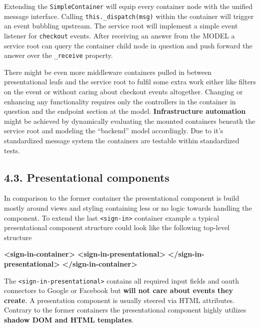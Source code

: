 \documentclass[]{article}
\newenvironment{Shaded}{}{}
\newcommand{\KeywordTok}[1]{\textcolor[rgb]{0.00,0.44,0.13}{\textbf{{#1}}}}
\begin{document}
Extending the \texttt{SimpleContainer} will equip every container node
with the unified message interface. Calling
\texttt{this.\_dispatch(msg)} within the container will trigger an event
bubbling upstream. The service root will implement a simple event
listener for \texttt{checkout} events. After receiving an answer from
the MODEL a service root can query the container child node in question
and push forward the answer over the \texttt{\_receive} property.

There might be even more middleware containers pulled in between
presentational leafs and the service root to fulfil some extra work
either like filters on the event or without caring about checkout events
altogether. Changing or enhancing any functionality requires only the
controllers in the container in question and the endpoint section at the
model. \textbf{Infrastructure automation} might be achieved by
dynamically evaluating the mounted containers beneath the service root
and modeling the ``backend'' model accordingly. Due to it's standardized
message system the containers are testable within standardized tests.

\subsection{4.3. Presentational
components}\label{presentational-components}

In comparison to the former container the presentational component is
build mostly around views and styling containing less or no logic
towards handling the component. To extend the last
\texttt{\textless{}sign-in\textgreater{}} container example a typical
presentational component structure could look like the following
top-level structure

\begin{Shaded}
\begin{Highlighting}[]
\KeywordTok{<sign-in-container>}
  \KeywordTok{<sign-in-presentational>}
  \KeywordTok{</sign-in-presentational>}
\KeywordTok{</sign-in-container>}
\end{Highlighting}
\end{Shaded}

The \texttt{\textless{}sign-in-presentational\textgreater{}} contains
all required input fields and oauth connectors to Google or Facebook but
\textbf{will not care about events they create}. A presentation
component is usually steered via HTML attributes. Contrary to the former
containers the presentational component highly utilizes \textbf{shadow
DOM and HTML templates}.
\end{document}
